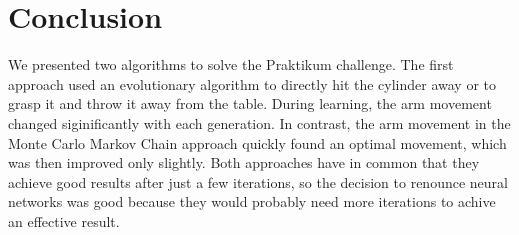 \section{Conclusion} \label{sec:conclusion}

We presented two algorithms to solve the Praktikum challenge.
The first approach used an evolutionary algorithm to directly hit the cylinder away or to grasp it and throw it away from the table. During learning, the arm movement changed siginificantly with each generation.
In contrast, the arm movement in the Monte Carlo Markov Chain approach quickly found an optimal movement, which was then improved only slightly.
Both approaches have in common that they achieve good results after just a few iterations, so the decision to renounce neural networks was good because they would probably need more iterations to achive an effective result.
